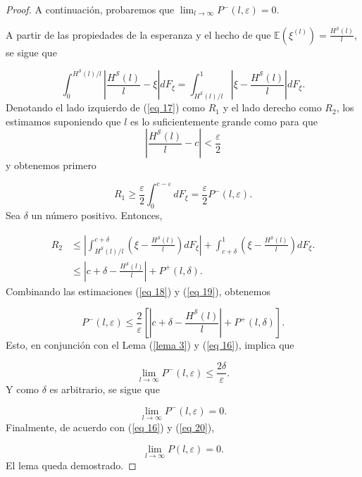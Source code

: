 \documentclass{report}
\begin{document}
\begin{proof}
    A continuación, probaremos que \( \lim_{l \to \infty} P^-(l, \varepsilon) = 0\).\newline
    
    A partir de las propiedades de la esperanza y el hecho de que \( \mathbb{E} (\xi^{(l)}) = \frac{H^{\mathcal{S}}(l)}{l} \), se sigue que

    \begin{equation}\label{eq 17}
    \int_{0}^{H^{\mathcal{S}}(l)/l} \left| \frac{H^{\mathcal{S}}(l)}{l} - \xi \right| dF_{\xi} =
    \int_{H^{\mathcal{S}}(l)/l}^{1} \left| \xi - \frac{H^{\mathcal{S}}(l)}{l} \right| dF_{\xi}.
    \end{equation}
    Denotando el lado izquierdo de (\ref{eq 17}) como \( R_1 \) y el lado derecho como \( R_2 \), 
    los estimamos suponiendo que \( l \) es lo suficientemente grande como para que 
    \[
    \left| \frac{H^{\mathcal{S}}(l)}{l} - c \right| < \frac{\varepsilon}{2}
    \]
    y obtenemos primero
    
    \begin{equation}\label{eq 18}
    R_1 \geq \frac{\varepsilon}{2} \int_{0}^{c - \varepsilon} dF_{\xi} = \frac{\varepsilon}{2} P^-(l, \varepsilon).
    \end{equation}
    Sea \( \delta \) un número positivo. Entonces,

    \begin{equation}\label{eq 19}
        \begin{aligned}
            R_2 & \leq \left| \int_{H^{\mathcal{S}}(l)/l}^{c + \delta} \left( \xi - \frac{H^{\mathcal{S}}(l)}{l} \right) dF_{\xi} \right|
            + \int_{c + \delta}^{1} \left( \xi - \frac{H^{\mathcal{S}}(l)}{l} \right) dF_{\xi}.\\
            & \leq \left| c + \delta - \frac{H^{\mathcal{S}}(l)}{l} \right| + P^+(l, \delta).
        \end{aligned}
    \end{equation}
    Combinando las estimaciones (\ref{eq 18}) y (\ref{eq 19}), obtenemos

    \begin{equation}
    P^-(l, \varepsilon) \leq \frac{2}{\varepsilon} \left[ \left| c + \delta - \frac{H^{\mathcal{S}}(l)}{l} \right| + P^+(l, \delta) \right].
    \end{equation}
    Esto, en conjunción con el Lema (\ref{lema 3}) y (\ref{eq 16}), implica que

    \begin{equation*}
    \lim_{l \to \infty} P^-(l, \varepsilon) \leq \frac{2\delta}{\varepsilon}.
    \end{equation*}
    Y como \( \delta \) es arbitrario, se sigue que

    \begin{equation}\label{eq 20}
    \lim_{l \to \infty} P^-(l, \varepsilon) = 0.
    \end{equation}
    Finalmente, de acuerdo con (\ref{eq 16}) y (\ref{eq 20}),

    \begin{equation*}
    \lim_{l \to \infty} P(l, \varepsilon) = 0.
    \end{equation*}
    El lema queda demostrado.
\end{proof}
\end{document}
